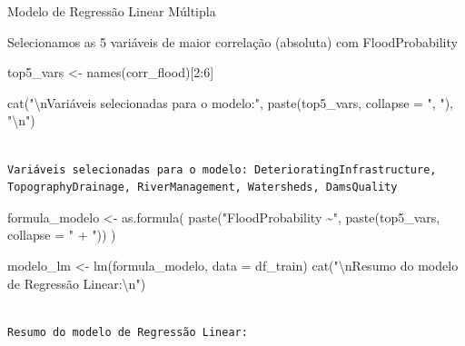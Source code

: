 \documentclass[
  letterpaper,
  DIV=11,
  numbers=noendperiod]{scrartcl}
\newenvironment{Shaded}{\begin{snugshade}}{\end{snugshade}}
\newcommand{\AttributeTok}[1]{\textcolor[rgb]{0.40,0.45,0.13}{#1}}
\newcommand{\DecValTok}[1]{\textcolor[rgb]{0.68,0.00,0.00}{#1}}
\newcommand{\FunctionTok}[1]{\textcolor[rgb]{0.28,0.35,0.67}{#1}}
\newcommand{\NormalTok}[1]{\textcolor[rgb]{0.00,0.23,0.31}{#1}}
\newcommand{\OtherTok}[1]{\textcolor[rgb]{0.00,0.23,0.31}{#1}}
\newcommand{\SpecialCharTok}[1]{\textcolor[rgb]{0.37,0.37,0.37}{#1}}
\newcommand{\StringTok}[1]{\textcolor[rgb]{0.13,0.47,0.30}{#1}}
\begin{document}
Modelo de Regressão Linear Múltipla

Selecionamos as 5 variáveis de maior correlação (absoluta) com
FloodProbability

\begin{Shaded}
\begin{Highlighting}[]
\NormalTok{top5\_vars }\OtherTok{\textless{}{-}} \FunctionTok{names}\NormalTok{(corr\_flood)[}\DecValTok{2}\SpecialCharTok{:}\DecValTok{6}\NormalTok{] }

\FunctionTok{cat}\NormalTok{(}\StringTok{"}\SpecialCharTok{\textbackslash{}n}\StringTok{Variáveis selecionadas para o modelo:"}\NormalTok{, }\FunctionTok{paste}\NormalTok{(top5\_vars, }\AttributeTok{collapse =} \StringTok{", "}\NormalTok{), }\StringTok{"}\SpecialCharTok{\textbackslash{}n}\StringTok{"}\NormalTok{)}
\end{Highlighting}
\end{Shaded}

\begin{verbatim}

Variáveis selecionadas para o modelo: DeterioratingInfrastructure, TopographyDrainage, RiverManagement, Watersheds, DamsQuality 
\end{verbatim}

\begin{Shaded}
\begin{Highlighting}[]
\NormalTok{formula\_modelo }\OtherTok{\textless{}{-}} \FunctionTok{as.formula}\NormalTok{(}
  \FunctionTok{paste}\NormalTok{(}\StringTok{"FloodProbability \textasciitilde{}"}\NormalTok{, }\FunctionTok{paste}\NormalTok{(top5\_vars, }\AttributeTok{collapse =} \StringTok{" + "}\NormalTok{))}
\NormalTok{)}
\end{Highlighting}
\end{Shaded}

\begin{Shaded}
\begin{Highlighting}[]
\NormalTok{modelo\_lm }\OtherTok{\textless{}{-}} \FunctionTok{lm}\NormalTok{(formula\_modelo, }\AttributeTok{data =}\NormalTok{ df\_train)}
\FunctionTok{cat}\NormalTok{(}\StringTok{"}\SpecialCharTok{\textbackslash{}n}\StringTok{Resumo do modelo de Regressão Linear:}\SpecialCharTok{\textbackslash{}n}\StringTok{"}\NormalTok{)}
\end{Highlighting}
\end{Shaded}

\begin{verbatim}

Resumo do modelo de Regressão Linear:
\end{verbatim}
\end{document}
